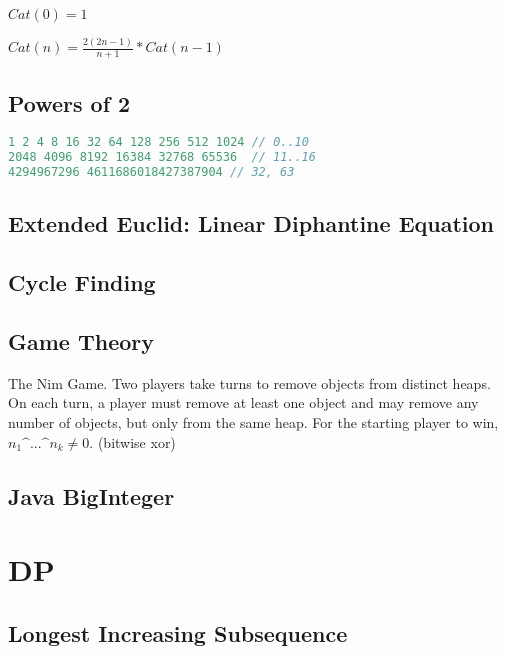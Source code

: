 \documentclass[a4paper,landscape,8pt]{article}
\begin{document}
\begin{multicols}{2}
$Cat(0) = 1$

$Cat(n) = \frac{2(2n - 1)}{n + 1} * Cat(n - 1)$

\subsection{Powers of 2}
\begin{lstlisting}[language=C++]
1 2 4 8 16 32 64 128 256 512 1024 // 0..10
2048 4096 8192 16384 32768 65536  // 11..16
4294967296 4611686018427387904 // 32, 63
\end{lstlisting}

\subsection{Extended Euclid: Linear Diphantine Equation}


\subsection{Cycle Finding}


\subsection{Game Theory}

The Nim Game. Two players take turns to remove objects from distinct heaps. On each turn, a player must remove at least one object and may remove any number of objects, but only from the same heap. For the starting player to win, $n_1 \text{\textasciicircum{}} ... \text{\textasciicircum{}} n_k \neq 0$. (bitwise xor)

\subsection{Java BigInteger}






\section{DP}

\subsection{Longest Increasing Subsequence}



\end{multicols}
\end{document}
